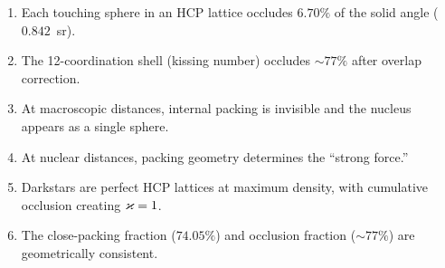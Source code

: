 \begin{enumerate}
  \item Each touching sphere in an HCP lattice occludes $6.70\%$ of the solid angle ($0.842$~sr).
  \item The 12-coordination shell (kissing number) occludes $\sim 77\%$ after overlap correction.
  \item At macroscopic distances, internal packing is invisible and the nucleus appears as a single sphere.
  \item At nuclear distances, packing geometry determines the ``strong force.''
  \item Darkstars are perfect HCP lattices at maximum density, with cumulative occlusion creating $\varkappa = 1$.
  \item The close-packing fraction ($74.05\%$) and occlusion fraction ($\sim 77\%$) are geometrically consistent.
\end{enumerate}
